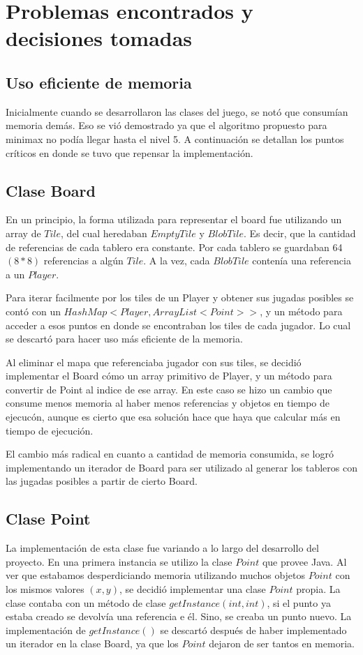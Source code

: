 \documentclass[10pt,a4paper,notitlepage,draft]{article}
\begin{document}
\section{Problemas encontrados y decisiones tomadas}
\subsection{Uso eficiente de memoria}
  Inicialmente cuando se desarrollaron las clases del juego, se notó que consumían memoria demás.
  Eso se vió demostrado ya que el algoritmo propuesto para minimax no podía llegar hasta el nivel 5.
  A continuación se detallan los puntos críticos en donde se tuvo que repensar la implementación.

  \subsection{Clase Board}
    En un principio, la forma utilizada para representar el board fue utilizando un array de $Tile$, del cual heredaban $EmptyTile$ y $BlobTile$.
    Es decir, que la cantidad de referencias de cada tablero era constante.
    Por cada tablero se guardaban 64 $(8 * 8)$ referencias a algún $Tile$.  A la vez, cada $BlobTile$ contenía una referencia a un $Player$.

    Para iterar facilmente por los tiles de un Player y obtener sus jugadas posibles se contó con un $HashMap<Player, ArrayList<Point>>$, y un método para acceder a esos  puntos en donde se encontraban los tiles de cada jugador. Lo cual se descartó para hacer uso más eficiente de la memoria.

    Al eliminar el mapa que referenciaba jugador con sus tiles, se decidió implementar el Board cómo un array primitivo de Player, y un método para convertir de Point al indice de ese array.
    En este caso se hizo un cambio que consume menos memoria al haber menos referencias y objetos en tiempo de ejecucón, aunque es cierto que esa solución hace que haya que calcular más en tiempo de ejecución.

    El cambio más radical en cuanto a cantidad de memoria consumida, se logró implementando un iterador de Board para ser utilizado al generar los tableros con
    las jugadas posibles a partir de cierto Board.

  \subsection{Clase Point}
    La implementación de esta clase fue variando a lo largo del desarrollo del proyecto. En una primera instancia se utilizo la clase $Point$ que provee Java.
    Al ver que estabamos desperdiciando memoria utilizando muchos objetos $Point$ con los mismos valores $(x, y)$, se decidió implementar una clase $Point$ propia.
    La clase contaba con un método de clase $getInstance(int, int)$, si el punto ya estaba creado se devolvía una referencia e él. Sino, se creaba un punto nuevo.
    La implementación de $getInstance()$ se descartó después de haber implementado un iterador en la clase Board, ya que los $Point$ dejaron de ser tantos en memoria.
\end{document}
